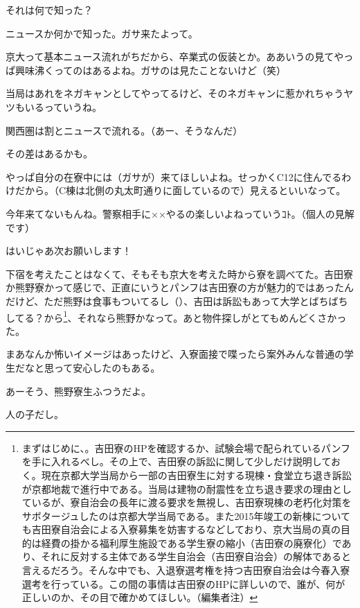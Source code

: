 \begin{multicols}{2}
  それは何で知った？

  ニュースか何かで知った。ガサ来たよって。


  京大って基本ニュース流れがちだから、卒業式の仮装とか。ああいうの見てやっぱ興味沸くってのはあるよね。ガサのは見たことないけど（笑）

  当局はあれをネガキャンとしてやってるけど、そのネガキャンに惹かれちゃうヤツもいるっていうね。

  関西圏は割とニュースで流れる。（あー、そうなんだ）

  その差はあるかも。

  やっぱ自分の在寮中には（ガサが）来てほしいよね。せっかくC12に住んでるわけだから。（C棟は北側の丸太町通りに面しているので）見えるといいなって。

  今年来てないもんね。警察相手に××やるの楽しいよねっていうｺﾄ。（個人の見解です）

  はいじゃあ次お願いします！

  下宿を考えたことはなくて、そもそも京大を考えた時から寮を調べてた。吉田寮か熊野寮かって感じで、正直にいうとパンフは吉田寮の方が魅力的ではあったんだけど、ただ熊野は食事もついてるし（）、吉田は訴訟もあって大学とばちばちしてる？から\footnote{まずはじめに、。吉田寮のHPを確認するか、試験会場で配られているパンフを手に入れるべし。その上で、吉田寮の訴訟に関して少しだけ説明しておく。現在京都大学当局から一部の吉田寮生に対する現棟・食堂立ち退き訴訟が京都地裁で進行中である。当局は建物の耐震性を立ち退き要求の理由としているが、寮自治会の長年に渡る要求を無視し、吉田寮現棟の老朽化対策をサボタージュしたのは京都大学当局である。また2015年竣工の新棟についても吉田寮自治会による入寮募集を妨害するなどしており、京大当局の真の目的は経費の掛かる福利厚生施設である学生寮の縮小（吉田寮の廃寮化）であり、それに反対する主体である学生自治会（吉田寮自治会）の解体であると言えるだろう。そんな中でも、入退寮選考権を持つ吉田寮自治会は今春入寮選考を行っている。この間の事情は吉田寮のHPに詳しいので、誰が、何が正しいのか、その目で確かめてほしい。（編集者注）}、それなら熊野かなって。あと物件探しがとてもめんどくさかった。

  まあなんか怖いイメージはあったけど、入寮面接で喋ったら案外みんな普通の学生だなと思って安心したのもある。

  あーそう、熊野寮生ふつうだよ。

  人の子だし。


\end{multicols}
